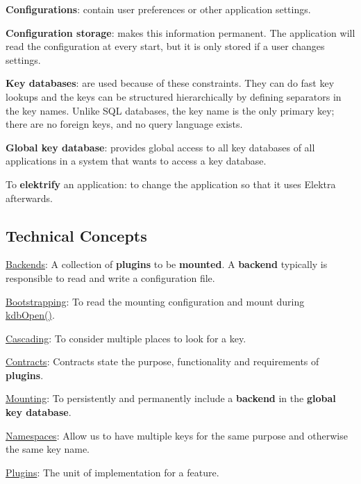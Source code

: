 
\begin{DoxyItemize}
\item {\bfseries Configurations}\+: contain user preferences or other application settings.
\item {\bfseries Configuration storage}\+: makes this information permanent. The application will read the configuration at every start, but it is only stored if a user changes settings.
\item {\bfseries Key databases}\+: are used because of these constraints. They can do fast key lookups and the keys can be structured hierarchically by defining separators in the key names. Unlike S\+Q\+L databases, the key name is the only primary key; there are no foreign keys, and no query language exists.
\item {\bfseries Global key database}\+: provides global access to all key databases of all applications in a system that wants to access a key database.
\item To {\bfseries elektrify} an application\+: to change the application so that it uses Elektra afterwards.
\end{DoxyItemize}

\subsection*{Technical Concepts}


\begin{DoxyItemize}
\item \hyperlink{md_doc_help_elektra-backends_doc_help_elektra-backends_md}{Backends}\+: A collection of {\bfseries plugins} to be {\bfseries mounted}. A {\bfseries backend} typically is responsible to read and write a configuration file.
\item \hyperlink{md_doc_help_elektra-bootstrapping_doc_help_elektra-bootstrapping_md}{Bootstrapping}\+: To read the mounting configuration and mount during {\ttfamily \hyperlink{group__kdb_ga6808defe5870f328dd17910aacbdc6ca}{kdb\+Open()}}.
\item \hyperlink{md_doc_help_elektra-cascading_doc_help_elektra-cascading_md}{Cascading}\+: To consider multiple places to look for a key.
\item \hyperlink{md_doc_help_elektra-contracts_doc_help_elektra-contracts_md}{Contracts}\+: Contracts state the purpose, functionality and requirements of {\bfseries plugins}.
\item \hyperlink{md_doc_help_elektra-mounting_doc_help_elektra-mounting_md}{Mounting}\+: To persistently and permanently include a {\bfseries backend} in the {\bfseries global key database}.
\item \hyperlink{md_doc_help_elektra-namespaces_doc_help_elektra-namespaces_md}{Namespaces}\+: Allow us to have multiple keys for the same purpose and otherwise the same key name.
\item \hyperlink{md_doc_help_elektra-plugins-framework_doc_help_elektra-plugins-framework_md}{Plugins}\+: The unit of implementation for a feature.
\end{DoxyItemize}

